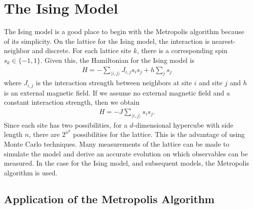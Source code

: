\documentclass[11pt]{article}
\begin{document}
\section{The Ising Model}
The Ising model is a good place to begin with the Metropolis algorithm because of its simplicity. On the lattice for the Ising model, the interaction is nearest-neighbor and discrete. For each lattice site $k$, there is a corresponding spin $s_k\in\{-1,1\}$. Given this, the Hamiltonian for the Ising model is
\begin{align}
	H=-\sum_{\langle i,j\rangle}J_{i,j}s_is_j+h\sum_js_j
\end{align}
where $J_{i,j}$ is the interaction strength between neighbors at site $i$ and site $j$ and $h$ is an external magnetic field. If we assume no external magnetic field and a constant interaction strength, then we obtain
\begin{align}
	H=-J\sum_{\langle i,j\rangle}s_is_j.
	\label{eq:Energy}
\end{align} Since each site has two possibilities, for a $d$-dimensional hypercube with side length $n$, there are $2^{n^d}$ possibilities for the lattice. This is the advantage of using Monte Carlo techniques. Many measurements of the lattice can be made to simulate the model and derive an accurate evolution on which observables can be measured. In the case for the Ising model, and subsequent models, the Metropolis algorithm is used.

\subsection{Application of the Metropolis Algorithm}
\end{document}
